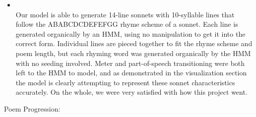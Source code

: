 \begin{itemize}
    \item {} \\
    
    Our model is able to generate 14-line sonnets with 10-syllable lines that
    follow the ABABCDCDEFEFGG rhyme scheme of a sonnet. Each line is generated
    organically by an HMM, using no manipulation to get it into the correct
    form. Individual lines are pieced together to fit the rhyme scheme and
    poem length, but each rhyming word was generated organically by the HMM
    with no seeding involved. Meter and part-of-speech transitioning were
    both left to the HMM to model, and as demonstrated in the visualization 
    section the model is clearly attempting to represent these sonnet
    characteristics accurately. On the whole, we were very satisfied with 
    how this project went.
\end{itemize}

Poem Progression:


